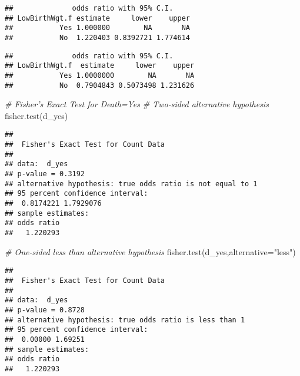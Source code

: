 \documentclass[
]{article}
\newenvironment{Shaded}{\begin{snugshade}}{\end{snugshade}}
\newcommand{\AttributeTok}[1]{\textcolor[rgb]{0.77,0.63,0.00}{#1}}
\newcommand{\CommentTok}[1]{\textcolor[rgb]{0.56,0.35,0.01}{\textit{#1}}}
\newcommand{\FunctionTok}[1]{\textcolor[rgb]{0.00,0.00,0.00}{#1}}
\newcommand{\NormalTok}[1]{#1}
\newcommand{\SpecialCharTok}[1]{\textcolor[rgb]{0.00,0.00,0.00}{#1}}
\newcommand{\StringTok}[1]{\textcolor[rgb]{0.31,0.60,0.02}{#1}}
\begin{document}
\begin{verbatim}
##              odds ratio with 95% C.I.
## LowBirthWgt.f estimate     lower    upper
##           Yes 1.000000        NA       NA
##           No  1.220403 0.8392721 1.774614
\end{verbatim}

\begin{Shaded}
\end{Shaded}

\begin{verbatim}
##              odds ratio with 95% C.I.
## LowBirthWgt.f  estimate     lower    upper
##           Yes 1.0000000        NA       NA
##           No  0.7904843 0.5073498 1.231626
\end{verbatim}

\begin{Shaded}
\begin{Highlighting}[]
\CommentTok{\# Fisher’s Exact Test for Death=Yes}
\CommentTok{\# Two{-}sided alternative hypothesis}
\FunctionTok{fisher.test}\NormalTok{(d\_yes)}
\end{Highlighting}
\end{Shaded}

\begin{verbatim}
## 
##  Fisher's Exact Test for Count Data
## 
## data:  d_yes
## p-value = 0.3192
## alternative hypothesis: true odds ratio is not equal to 1
## 95 percent confidence interval:
##  0.8174221 1.7929076
## sample estimates:
## odds ratio 
##   1.220293
\end{verbatim}

\begin{Shaded}
\begin{Highlighting}[]
\CommentTok{\# One{-}sided less than alternative hypothesis}
\FunctionTok{fisher.test}\NormalTok{(d\_yes,}\AttributeTok{alternative=}\StringTok{"less"}\NormalTok{)}
\end{Highlighting}
\end{Shaded}

\begin{verbatim}
## 
##  Fisher's Exact Test for Count Data
## 
## data:  d_yes
## p-value = 0.8728
## alternative hypothesis: true odds ratio is less than 1
## 95 percent confidence interval:
##  0.00000 1.69251
## sample estimates:
## odds ratio 
##   1.220293
\end{verbatim}
\end{document}
